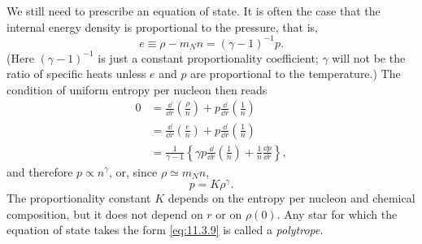 We still need to prescribe an equation of state. It is often the case that the
internal energy density is proportional to the pressure, that is,
\begin{equation}
  e\equiv\rho-m_Nn=(\gamma-1)^{-1}p.
  \tag{11.3.8}\label{eq:11.3.8}
\end{equation}
(Here \((\gamma-1)^{-1}\) is just a constant proportionality coefficient;
\(\gamma\) will not be the ratio of specific heats unless \(e\) and \(p\) are
proportional to the temperature.) The condition of uniform entropy per nucleon
then reads
\[
  \begin{aligned}
  0
  &=
  \frac{\dd}{\dd r}\left(\frac{\rho}{n}\right)
  +p\frac{\dd}{\dd r}\left(\frac1n\right)\\
  &=
  \frac{\dd}{\dd r}\left(\frac en\right)
  +p\frac{\dd}{\dd r}\left(\frac1n\right)\\
  &=
  \frac1{\gamma-1}
  \left\{
    \gamma p\frac{\dd}{\dd r}\left(\frac1n\right)
    +\frac1n\frac{\dd p}{\dd r}
  \right\},
  \end{aligned}
\]
and therefore \(p\propto n^\gamma\), or, since
\(\rho\simeq m_Nn\),
\begin{equation}
  p=K\rho^\gamma.
  \tag{11.3.9}\label{eq:11.3.9}
\end{equation}
The proportionality constant \(K\) depends on the entropy per nucleon and
chemical composition, but it does not depend on \(r\) or on \(\rho(0)\). Any
star for which the equation of state takes the form \eqref{eq:11.3.9} is
called a \emph{polytrope}.

